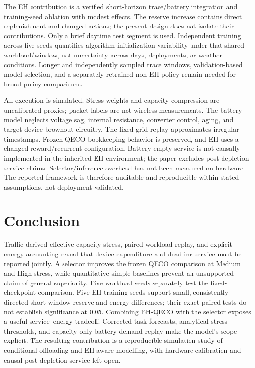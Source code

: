 \documentclass[conference]{IEEEtran}
\begin{document}
The EH contribution is a verified short-horizon trace/battery integration and training-seed ablation with modest effects. The reserve increase contains direct replenishment and changed actions; the present design does not isolate their contributions. Only a brief daytime test segment is used. Independent training across five seeds quantifies algorithm initialization variability under that shared workload/window, not uncertainty across days, deployments, or weather conditions. Longer and independently sampled trace windows, validation-based model selection, and a separately retrained non-EH policy remain needed for broad policy comparisons.

All execution is simulated. Stress weights and capacity compression are uncalibrated proxies; packet labels are not wireless measurements. The battery model neglects voltage sag, internal resistance, converter control, aging, and target-device brownout circuitry. The fixed-grid replay approximates irregular timestamps. Frozen QECO bookkeeping behavior is preserved, and EH uses a changed reward/recurrent configuration. Battery-empty service is not causally implemented in the inherited EH environment; the paper excludes post-depletion service claims. Selector/inference overhead has not been measured on hardware. The reported framework is therefore auditable and reproducible within stated assumptions, not deployment-validated.

\section{Conclusion}
Traffic-derived effective-capacity stress, paired workload replay, and explicit energy accounting reveal that device expenditure and deadline service must be reported jointly. A selector improves the frozen QECO comparison at Medium and High stress, while quantitative simple baselines prevent an unsupported claim of general superiority. Five workload seeds separately test the fixed-checkpoint comparison. Five EH training seeds support small, consistently directed short-window reserve and energy differences; their exact paired tests do not establish significance at 0.05. Combining EH-QECO with the selector exposes a useful service--energy tradeoff. Corrected task forecasts, analytical stress thresholds, and capacity-only battery-demand replay make the model's scope explicit. The resulting contribution is a reproducible simulation study of conditional offloading and EH-aware modelling, with hardware calibration and causal post-depletion service left open.
\end{document}
